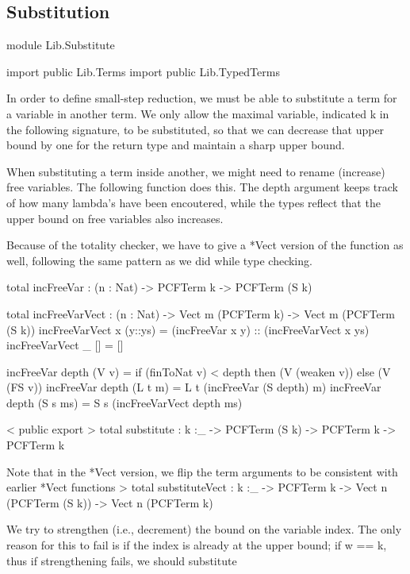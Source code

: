 \subsection{Substitution}

\begin{hidden}
module Lib.Substitute

import public Lib.Terms
import public Lib.TypedTerms
\end{hidden}

In order to define small-step reduction, we must be able to substitute a term
for a variable in another term.
We only allow the maximal variable, indicated k in the following signature, to be substituted,
so that we can decrease that upper bound by one for the return type and maintain a sharp upper bound.

When substituting a term inside another, we might need to rename (increase)
free variables. The following function does this.
The depth argument keeps track of how many lambda's have been encoutered,
while the types reflect that the upper bound on free variables also increases.

Because of the totality checker, we have to give a *Vect version of the function as well, following
the same pattern as we did while type checking.

\begin{code}
total incFreeVar : (n : Nat) -> PCFTerm k -> PCFTerm (S k)

total incFreeVarVect : (n : Nat) -> Vect m (PCFTerm k) -> Vect m (PCFTerm (S k))
incFreeVarVect x (y::ys) = (incFreeVar x y) :: (incFreeVarVect x ys)
incFreeVarVect _ [] = []

incFreeVar depth (V v)    = if (finToNat v) < depth
                              then (V (weaken v))
                            else (V (FS v))
incFreeVar depth (L t m)  = L t (incFreeVar (S depth) m)
incFreeVar depth (S s ms) = S s (incFreeVarVect depth ms)
\end{code}

< public export
> total substitute : {k :_} -> PCFTerm (S k) -> PCFTerm k -> PCFTerm k

Note that in the *Vect version, we flip the term arguments to be consistent with earlier *Vect functions
> total substituteVect : {k :_} -> PCFTerm k -> Vect n (PCFTerm (S k)) -> Vect n (PCFTerm k)

We try to strengthen (i.e., decrement) the bound on the variable index.
The only reason for this to fail is if the index is already at the upper bound; if w == k, thus
if strengthening fails, we should substitute

